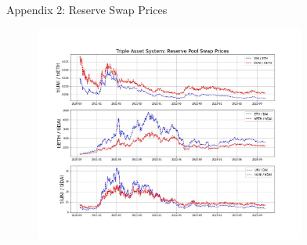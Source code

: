 \documentclass[10pt,xcolor=svgnames]{beamer} %
\begin{document}
\begin{frame}{Appendix 2: Reserve Swap Prices}
\begin{figure}[h!]
\includegraphics[width=3.5in]{img/swap_prices.jpg}
\label{fig:swap_prices}
\end{figure}
\end{frame}
\end{document}
